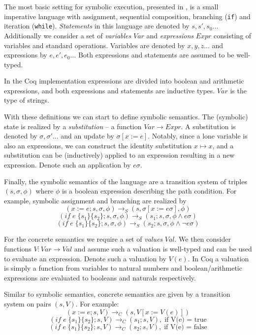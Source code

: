 \documentclass[submission,copyright,creativecommons]{eptcs}
\newcommand{\note}[1]{\color{WildStrawberry}{#1}\color{black}}
\begin{document}
The most basic setting for symbolic execution, presented in \cite[sec. 2]{boer2021},
is a small imperative language with assignment, sequential composition, branching (\texttt{if})
and iteration (\texttt{while}). \emph{Statements} in this language are denoted by $s, s', s_{0}...$
Additionally we consider a set of \emph{variables} $Var$ and \emph{expressions} $Expr$ consisting of variables and
standard operations. Variables are denoted by $x,y,z...$ and expressions by $e, e', e_{0}...$
Both expressions and statements are assumed to be well-typed.

In the Coq implementation expressions are divided into boolean and arithmetic expressions,
and both expressions and statements are inductive types. $Var$ is the type of strings.

With these definitions we can start to define symbolic semantics. The (symbolic) state is realized by a
  \emph{substitution} -- a function $Var \rightarrow Expr$. A substitution is denoted by $\sigma, \sigma'...$
and an update by $\sigma[x := e]$. Notably, since a lone variable is also an expressions, we can construct the
identity substitution $x \mapsto x$, and a substitution can be (inductively) applied to an expression resulting
in a new expression. Denote such an application by $e\sigma$.

Finally, the symbolic semantics of the language are a transition system of triples $(s, \sigma, \phi)$
where $\phi$ is a boolean expression describing the path condition.
For example, symbolic assignment and branching are realized by
\[(x := e ; s, \sigma, \phi) \rightarrow_{S} (s, \sigma[x := e\sigma], \phi) \]
\[(if \;e\; \{s_{1}\} \{s_{2}\} ; s, \sigma, \phi) \rightarrow_{S} (s_{1} ; s, \sigma, \phi \land e\sigma) \]
\[(if \;e\; \{s_{1}\} \{s_{2}\} ; s, \sigma, \phi) \rightarrow_{S} (s_{2} ; s, \sigma, \phi \land \neg e\sigma) \]

For the concrete semantics we require a set of \emph{values} $Val$. We then consider functions $V : Var \rightarrow Val$
and assume such a valuation is well-typed and can be used to evaluate an expression. Denote such a valuation by $V(e)$.
In Coq a valuation is simply a function from variables to natural numbers and boolean/arithmetic expressions are evaluated to
booleans and naturals respectively.

Similar to symbolic semantics, concrete semantics are given by a transition system on pairs $(s, V)$. For example:
\[(x := e ; s, V) \rightarrow_{C} (s, V[x := V(e)]) \]\note{define valuation update?}
\[(if \;e\; \{s_{1}\} \{s_{2}\} ; s, V) \rightarrow_{C} (s_{1} ; s, V),\; \mbox{if V(e) = true} \]
\[(if \;e\; \{s_{1}\} \{s_{2}\} ; s, V) \rightarrow_{C} (s_{2} ; s, V),\; \mbox{if V(e) = false} \]
\note{these examples take a lot of space, but are maybe more useful than in-text definitions}
\end{document}
